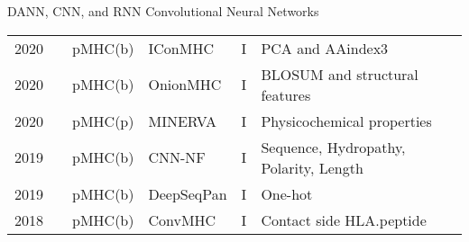 \documentclass[10pt]{beamer}
\newcommand{\1}{
	\setbeamertemplate{background}{
		\texttt{[image: img/1]}
		\tikz[overlay] \fill[fill opacity=0.75,fill=white] (0,0) rectangle (-\paperwidth,\paperheight);
	}
}
\begin{document}
\begin{frame}{DANN, CNN, and RNN }{Convolutional Neural Networks}
\begin{table}[]
{\begin{tabular}{p{0.6cm}p{0.6cm}p{1.5cm}p{2cm}p{0.6cm}p{2.7cm}}
				2020          & \cite{pei2020iconmhc}     & pMHC(b)      & IConMHC       & I        & PCA and AAindex3        \\
				2020          & \cite{saxena2020onionmhc} & pMHC(b)      & OnionMHC      & I        & BLOSUM and structural features                                                                  \\
				2020          & \cite{ng3704016minerva}   & pMHC(p) & MINERVA       & I        & Physicochemical properties                                                           \\
				2019          & \cite{zhao2019peptide}    & pMHC(b)      & CNN-NF        & I        & Sequence, Hydropathy, Polarity, Length                    \\
				2019          & \cite{liu2019deepseqpan}  & pMHC(b)      & DeepSeqPan    & I        & One-hot                                          \\
				2018          & \cite{han2018deep}        & pMHC(b)      & ConvMHC       & I        & Contact side HLA.peptide                                                                                 
			\end{tabular}
		}
	\end{table}	
\end{frame}
\end{document}
